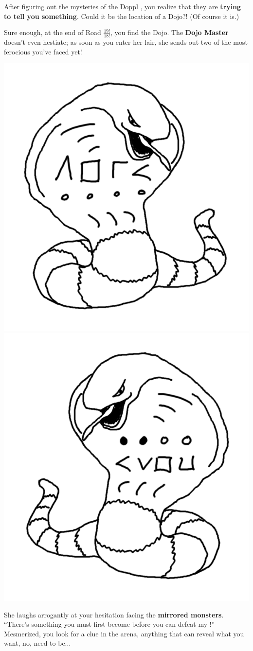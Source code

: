 

After figuring out the mysteries of the Doppl \mappMobimon{}, you realize
that they are \textbf{trying to tell you something}. Could it be the location of
a \mappMobimon{} Dojo?! (Of course it is.)

Sure enough, at the end of Road \(\frac{19!}{18!}\), you find the Dojo.
The \textbf{Dojo Master} doesn't even hestiate; as soon as you enter her lair,
she sends out two of the most ferocious \mappMobimon{} you've faced yet!

\begin{center}
\includegraphics[width=0.4\linewidth]{assets/not-arbok-1.png}
\includegraphics[width=0.4\linewidth]{assets/not-arbok-2.png}
\end{center}

She laughs arrogantly at your hesitation facing the \textbf{mirrored monsters}.
``There's something you must first become before you can defeat
my \mappMobimon{}!'' Mesmerized, you look for a clue in the arena,
anything that can reveal what you want, no, need to be...


